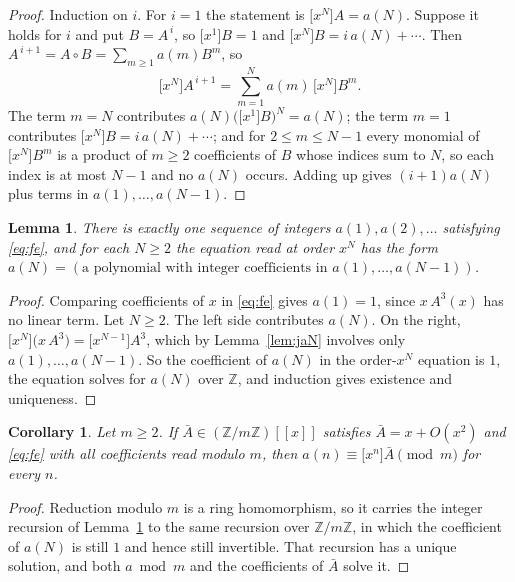 \documentclass[11pt,a4paper]{article}
\theoremstyle{plain}
\newtheorem{lemma}[theorem]{Lemma}
\newtheorem{corollary}[theorem]{Corollary}
\theoremstyle{definition}
\begin{document}
\begin{proof}
Induction on $i$. For $i=1$ the statement is $\bigl[x^{N}\bigr]A=a(N)$. Suppose it holds
for $i$ and put $B=A^{\,i}$, so $\bigl[x^{1}\bigr]B=1$ and
$\bigl[x^{N}\bigr]B=i\,a(N)+\cdots$. Then
$A^{\,i+1}=A\circ B=\sum_{m\ge1}a(m)B^{m}$, so
\[
\bigl[x^{N}\bigr]A^{\,i+1}=\sum_{m=1}^{N}a(m)\,\bigl[x^{N}\bigr]B^{m} .
\]
The term $m=N$ contributes $a(N)\bigl(\bigl[x^{1}\bigr]B\bigr)^{N}=a(N)$; the term $m=1$
contributes $\bigl[x^{N}\bigr]B=i\,a(N)+\cdots$; and for $2\le m\le N-1$ every monomial of
$\bigl[x^{N}\bigr]B^{m}$ is a product of $m\ge2$ coefficients of $B$ whose indices sum to
$N$, so each index is at most $N-1$ and no $a(N)$ occurs. Adding up gives $(i+1)a(N)$ plus
terms in $a(1),\dots,a(N-1)$.
\end{proof}

\begin{lemma}\label{lem:unique}
There is exactly one sequence of integers $a(1),a(2),\dots$ satisfying \eqref{eq:fe}, and
for each $N\ge2$ the equation read at order $x^{N}$ has the form
$a(N)=(\text{a polynomial with integer coefficients in }a(1),\dots,a(N-1))$.
\end{lemma}

\begin{proof}
Comparing coefficients of $x$ in \eqref{eq:fe} gives $a(1)=1$, since $x\,A^{3}(x)$ has
no linear term. Let $N\ge2$. The left side contributes $a(N)$. On the right,
$\bigl[x^{N}\bigr]\bigl(x\,A^{3}\bigr)=\bigl[x^{N-1}\bigr]A^{3}$, which by
Lemma~\ref{lem:jaN} involves only $a(1),\dots,a(N-1)$. So the coefficient of $a(N)$ in the
order-$x^{N}$ equation is $1$, the equation solves for $a(N)$ over $\mathbb{Z}$, and
induction gives existence and uniqueness.
\end{proof}

\begin{corollary}\label{cor:mod}
Let $m\ge2$. If $\bar A\in(\mathbb{Z}/m\mathbb{Z})[[x]]$ satisfies $\bar A=x+O(x^{2})$ and
\eqref{eq:fe} with all coefficients read modulo $m$, then
$a(n)\equiv\bigl[x^{n}\bigr]\bar A\pmod m$ for every $n$.
\end{corollary}

\begin{proof}
Reduction modulo $m$ is a ring homomorphism, so it carries the integer recursion of
Lemma~\ref{lem:unique} to the same recursion over $\mathbb{Z}/m\mathbb{Z}$, in which the
coefficient of $a(N)$ is still $1$ and hence still invertible. That recursion has a unique
solution, and both $a\bmod m$ and the coefficients of $\bar A$ solve it.
\end{proof}
\end{document}
